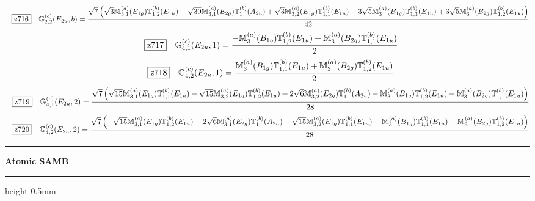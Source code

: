 \documentclass[fleqn,10pt,landscape]{jsarticle}
\begin{document}
\begin{dmath*}
\hspace*{3mm}\fbox{z716}\quad \mathbb{G}_{2,2}^{(c)}(E_{2u},b)=\frac{\sqrt{7} \left(\sqrt{3} \mathbb{M}_{3,1}^{(a)}(E_{1g}) \mathbb{T}_{1,2}^{(b)}(E_{1u}) - \sqrt{30} \mathbb{M}_{3,1}^{(a)}(E_{2g}) \mathbb{T}_{1}^{(b)}(A_{2u}) + \sqrt{3} \mathbb{M}_{3,2}^{(a)}(E_{1g}) \mathbb{T}_{1,1}^{(b)}(E_{1u}) - 3 \sqrt{5} \mathbb{M}_{3}^{(a)}(B_{1g}) \mathbb{T}_{1,1}^{(b)}(E_{1u}) + 3 \sqrt{5} \mathbb{M}_{3}^{(a)}(B_{2g}) \mathbb{T}_{1,2}^{(b)}(E_{1u})\right)}{42}
\end{dmath*}
\begin{dmath*}
\hspace*{3mm}\fbox{z717}\quad \mathbb{G}_{4,1}^{(c)}(E_{2u},1)=\frac{- \mathbb{M}_{3}^{(a)}(B_{1g}) \mathbb{T}_{1,2}^{(b)}(E_{1u}) + \mathbb{M}_{3}^{(a)}(B_{2g}) \mathbb{T}_{1,1}^{(b)}(E_{1u})}{2}
\end{dmath*}
\begin{dmath*}
\hspace*{3mm}\fbox{z718}\quad \mathbb{G}_{4,2}^{(c)}(E_{2u},1)=\frac{\mathbb{M}_{3}^{(a)}(B_{1g}) \mathbb{T}_{1,1}^{(b)}(E_{1u}) + \mathbb{M}_{3}^{(a)}(B_{2g}) \mathbb{T}_{1,2}^{(b)}(E_{1u})}{2}
\end{dmath*}
\begin{dmath*}
\hspace*{3mm}\fbox{z719}\quad \mathbb{G}_{4,1}^{(c)}(E_{2u},2)=\frac{\sqrt{7} \left(\sqrt{15} \mathbb{M}_{3,1}^{(a)}(E_{1g}) \mathbb{T}_{1,1}^{(b)}(E_{1u}) - \sqrt{15} \mathbb{M}_{3,2}^{(a)}(E_{1g}) \mathbb{T}_{1,2}^{(b)}(E_{1u}) + 2 \sqrt{6} \mathbb{M}_{3,2}^{(a)}(E_{2g}) \mathbb{T}_{1}^{(b)}(A_{2u}) - \mathbb{M}_{3}^{(a)}(B_{1g}) \mathbb{T}_{1,2}^{(b)}(E_{1u}) - \mathbb{M}_{3}^{(a)}(B_{2g}) \mathbb{T}_{1,1}^{(b)}(E_{1u})\right)}{28}
\end{dmath*}
\begin{dmath*}
\hspace*{3mm}\fbox{z720}\quad \mathbb{G}_{4,2}^{(c)}(E_{2u},2)=\frac{\sqrt{7} \left(- \sqrt{15} \mathbb{M}_{3,1}^{(a)}(E_{1g}) \mathbb{T}_{1,2}^{(b)}(E_{1u}) - 2 \sqrt{6} \mathbb{M}_{3,1}^{(a)}(E_{2g}) \mathbb{T}_{1}^{(b)}(A_{2u}) - \sqrt{15} \mathbb{M}_{3,2}^{(a)}(E_{1g}) \mathbb{T}_{1,1}^{(b)}(E_{1u}) + \mathbb{M}_{3}^{(a)}(B_{1g}) \mathbb{T}_{1,1}^{(b)}(E_{1u}) - \mathbb{M}_{3}^{(a)}(B_{2g}) \mathbb{T}_{1,2}^{(b)}(E_{1u})\right)}{28}
\end{dmath*}
\vspace{5mm}

\vspace{5mm}
\noindent \rule[0.5mm]{5mm}{0.5mm}\hspace{3mm}\textbf{Atomic SAMB}\hspace{3mm}\leaders\hrule height 0.5mm\hfill\kern0pt
\vspace{3mm}
\end{document}
